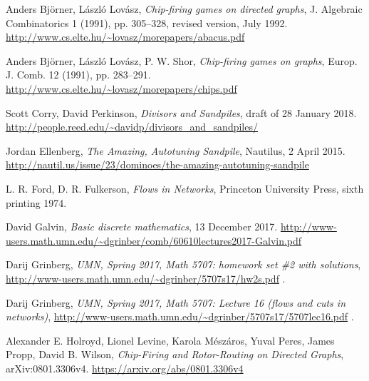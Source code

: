 \documentclass[numbers=enddot,12pt,final,onecolumn,notitlepage]{scrartcl}%
\theoremstyle{definition}
\begin{document}
\begin{thebibliography}{99999999}

Anders Bj\"orner, L\'aszl\'o Lov\'asz,
\textit{Chip-firing games on directed graphs},
J. Algebraic Combinatorics 1 (1991), pp. 305--328,
revised version, July 1992.
\newline\url{http://www.cs.elte.hu/~lovasz/morepapers/abacus.pdf}

Anders Bj\"orner, L\'aszl\'o Lov\'asz, P. W. Shor,
\textit{Chip-firing games on graphs},
Europ. J. Comb. 12 (1991), pp. 283--291.
\newline\url{http://www.cs.elte.hu/~lovasz/morepapers/chips.pdf}

Scott Corry, David Perkinson,
\textit{Divisors and Sandpiles},
draft of 28 January 2018.
\newline\url{http://people.reed.edu/~davidp/divisors_and_sandpiles/}

Jordan Ellenberg,
\textit{The Amazing, Autotuning Sandpile},
Nautilus, 2 April 2015.
\newline\url{http://nautil.us/issue/23/dominoes/the-amazing-autotuning-sandpile}

L. R. Ford, D. R. Fulkerson,
\textit{Flows in Networks},
Princeton University Press,
sixth printing 1974.

David Galvin, \textit{Basic discrete mathematics}, 13
December 2017.\newline
\url{http://www-users.math.umn.edu/~dgrinber/comb/60610lectures2017-Galvin.pdf}

Darij Grinberg,
\textit{UMN, Spring 2017, Math 5707: homework set \#2 with solutions},
\newline\url{http://www-users.math.umn.edu/~dgrinber/5707s17/hw2s.pdf} .

Darij Grinberg,
\textit{UMN, Spring 2017, Math 5707: Lecture 16 (flows and cuts in networks)},
\newline\url{http://www-users.math.umn.edu/~dgrinber/5707s17/5707lec16.pdf} .

Alexander E. Holroyd, Lionel Levine, Karola M\'esz\'aros,
Yuval Peres, James Propp, David B. Wilson,
\textit{Chip-Firing and Rotor-Routing on Directed Graphs},
arXiv:0801.3306v4.
\newline\url{https://arxiv.org/abs/0801.3306v4}


\end{thebibliography}
\end{document}
